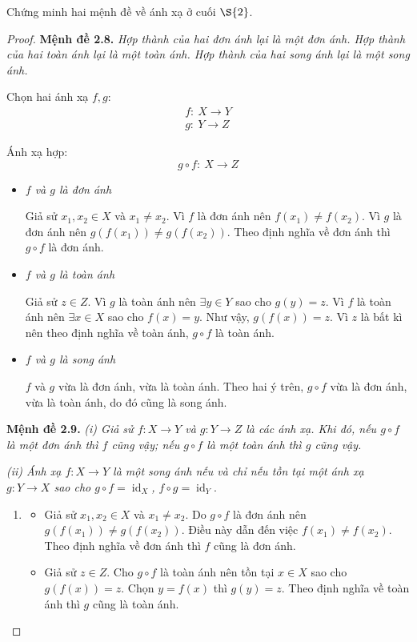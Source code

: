 \begin{exercise}Chứng minh hai mệnh đề về ánh xạ ở cuối $\S{2}$.
\end{exercise}

\begin{proof}\textbf{Mệnh đề 2.8.} \textit{Hợp thành của hai đơn ánh lại là một đơn ánh. Hợp thành của hai toàn ánh lại là một toàn ánh. Hợp thành của hai song ánh lại là một song ánh.}
    \par Chọn hai ánh xạ $f, g$:
    \begin{gather*}
        f:\ X \rightarrow Y \\
        g:\ Y \rightarrow Z
    \end{gather*}
    \par Ánh xạ hợp:
    \[ g\circ f:\ X \rightarrow Z \]

    \begin{itemize}
        \item \textit{$f$ và $g$ là đơn ánh}

              Giả sử $x_{1}, x_{2} \in X$ và $x_{1}\ne x_{2}$. Vì $f$ là đơn ánh nên $f(x_{1}) \ne f(x_{2})$. Vì $g$ là đơn ánh nên $g(f(x_{1})) \ne g(f(x_{2}))$. Theo định nghĩa về đơn ánh thì $g\circ f$ là đơn ánh.

        \item \textit{$f$ và $g$ là toàn ánh}

              Giả sử $z \in Z$. Vì $g$ là toàn ánh nên $\exists y\in Y$ sao cho $g(y) = z$. Vì $f$ là toàn ánh nên $\exists x\in X$ sao cho $f(x) = y$. Như vậy, $g(f(x)) = z$. Vì $z$ là bất kì nên theo định nghĩa về toàn ánh, $g\circ f$ là toàn ánh.
        \item \textit{$f$ và $g$ là song ánh}

              $f$ và $g$ vừa là đơn ánh, vừa là toàn ánh. Theo hai ý trên, $g\circ f$ vừa là đơn ánh, vừa là toàn ánh, do đó cũng là song ánh.
    \end{itemize}

    \textbf{Mệnh đề 2.9.} \textit{(i) Giả sử $f: X\rightarrow Y$ và $g: Y\rightarrow Z$ là các ánh xạ. Khi đó, nếu $g\circ f$ là một đơn ánh thì $f$ cũng vậy; nếu $g\circ f$ là một toàn ánh thì $g$ cũng vậy.}
    
    \textit{(ii) Ánh xạ $f: X\rightarrow Y$ là một song ánh nếu và chỉ nếu tồn tại một ánh xạ $g: Y\rightarrow X$ sao cho $g\circ f = \operatorname{id}_{X}$, $f\circ g = \operatorname{id}_{Y}$}.

    \begin{enumerate}[label = (\roman*)]
        \item
              \begin{itemize}
                  \item Giả sử $x_{1}, x_{2} \in X$ và $x_{1}\ne x_{2}$. Do $g\circ f$ là đơn ánh nên $g(f(x_{1})) \ne g(f(x_{2}))$. Điều này dẫn đến việc $f(x_{1}) \ne f(x_{2})$. Theo định nghĩa về đơn ánh thì $f$ cũng là đơn ánh.
                  \item Giả sử $z\in Z$. Cho $g\circ f$ là toàn ánh nên tồn tại $x\in X$ sao cho $g(f(x)) = z$. Chọn $y = f(x)$ thì $g(y) = z$. Theo định nghĩa về toàn ánh thì $g$ cũng là toàn ánh.
              \end{itemize}


\end{enumerate}
\end{proof}
